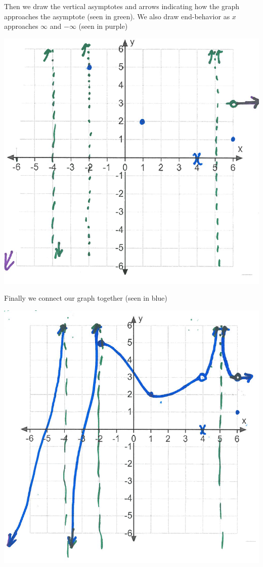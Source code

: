 \documentclass[nooutcomes]{ximera}
\begin{document}
\begin{problem}
\begin{freeResponse}
	Then we draw the vertical asymptotes and arrows indicating how the graph approaches the asymptote (seen in green).  We also draw end-behavior as $x$ approaches $\infty$ and $-\infty$ (seen in purple)
	\begin{image}
	\includegraphics[scale = 0.4]{figure11.png}
	\end{image}

	Finally we connect our graph together (seen in blue)
	\begin{image}
    \includegraphics[scale = 0.4]{figure12.png}  
	\end{image}

  \end{freeResponse}
\end{problem}
\end{document}
